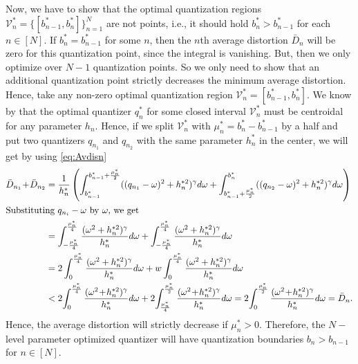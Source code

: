 \documentclass[12pt,onecolumn,journal,draftclsnofoot,letterpaper]{IEEEtran}
\newcommand{\Vor}{\ensuremath{\mathcal{V}}}         %
\newcommand{\Dis}{\ensuremath{D}}                    %
\newcommand{\AvDis}{\ensuremath{\bar{\Dis}}}         %
\begin{document}

  Now, we have to show that the optimal quantization regions $\Vor_n^*=\{[b^*_{n-1},b^*_n]\}_{n=1}^N$ are not points, i.e.,
  it should hold $b^*_n>b^*_{n-1}$ for each $n\in[N]$. If $b^*_n=b^*_{n-1}$ for some $n$, then the $n$th average distortion $\AvDis_n$
  will be zero for this quantization point, since the integral is vanishing. But, then we only optimize over $N-1$
  quantization points. So we only need to show that an additional quantization point strictly decreases the minimum
  average distortion.  Hence, take any non-zero optimal quantization region $\Vor_n^*=[b^*_{n-1},b^*_n]$. We know by
   that the optimal quantizer $q_n^*$ for some closed interval $\Vor_n^*$  must be centroidal for
  any parameter $h_n$.  Hence, if we split  $\Vor_n^*$ with  $\mu_n^*=b^*_n-b^*_{n-1}$ by a half and put two quantizers
  $q_{n_1}$ and $q_{n_2}$ with the same parameter $h_n^*$ in the center, we will get by using \eqref{eq:Avdisn}
  \begin{align}
      \AvDis_{n_1}\!+\!\AvDis_{n_2}&=\frac{1}{h_n^*} 
     \left( \int_{b^*_{n-1}}^{b^*_{n-1}+\frac{\mu_n^*}{2}} ( (q_{n_1}-\ome)^2 + h_n^{*2})^{\gam}d\ome
     +\int_{b_{n-1}^*+\frac{\mu_n^*}{2}}^{b_n^*}((q_{n_2}-\ome)^2+h_n^{*2})^{\gam}d\ome\right)\notag\\
   \intertext{Substituting $q_{n_i}-\ome$ by $\ome$, we get} 
     & =  \int_{-\frac{\mu_n^*}{4}}^{\frac{\mu_n^*}{4}} \frac{(\ome^2+h_n^{*2})^{\gam}}{h_n^*}d\ome
     + \int_{-\frac{\mu_n^*}{4}}^{\frac{\mu_n^*}{4}} \frac{(\ome^2+h_n^{*2})^{\gam}}{h_n^*}d\ome\\
     & =  2\int_{0}^{\frac{\mu_n^*}{4}} \frac{(\ome^2+h_n^{*2})^{\gam}}{h_n^*}d\ome 
     + w\int_{0}^{\frac{\mu_n^*}{4}}    \frac{ (\ome^2+h_n^{*2})^{\gam}}{h_n^*}d\ome\\
     & <  2\!\int_{0}^{\frac{\mu_n^*}{4}} \frac{(\ome^2\!+\!h_n^{*2})^{\gam}}{h_n^*}d\ome
     + 2\!\int_{\frac{\mu_n^*}{4}}^{\frac{\mu_n^*}{2}} \frac{(\ome^2\!+\!h_n^{*2})^{\gam}}{h_n^*}d\ome
     = 2\!\int_0^{\frac{\mu_n^*}{2}} \frac{(\ome^2\!+\!h_n^{*2})^\gam}{h_n^*} d\ome=\AvDis_n.
  \end{align}
  Hence, the average distortion will strictly decrease if $\mu_n^*>0$. Therefore, the $N-$level parameter optimized
  quantizer will have
  quantization boundaries $b_n\!>\!b_{n\!-\!1}$ for $n\in[N]$.
\end{document}
